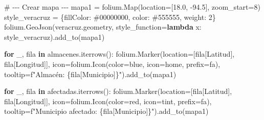 \documentclass[
  spanish,
  us-letterpaper,
]{scrreprt}
\newenvironment{Shaded}{\begin{snugshade}}{\end{snugshade}}
\newcommand{\CommentTok}[1]{\textcolor[rgb]{0.37,0.37,0.37}{#1}}
\newcommand{\ControlFlowTok}[1]{\textcolor[rgb]{0.00,0.23,0.31}{\textbf{#1}}}
\newcommand{\DecValTok}[1]{\textcolor[rgb]{0.68,0.00,0.00}{#1}}
\newcommand{\FloatTok}[1]{\textcolor[rgb]{0.68,0.00,0.00}{#1}}
\newcommand{\KeywordTok}[1]{\textcolor[rgb]{0.00,0.23,0.31}{\textbf{#1}}}
\newcommand{\NormalTok}[1]{\textcolor[rgb]{0.00,0.23,0.31}{#1}}
\newcommand{\OperatorTok}[1]{\textcolor[rgb]{0.37,0.37,0.37}{#1}}
\newcommand{\SpecialCharTok}[1]{\textcolor[rgb]{0.37,0.37,0.37}{#1}}
\newcommand{\SpecialStringTok}[1]{\textcolor[rgb]{0.13,0.47,0.30}{#1}}
\newcommand{\StringTok}[1]{\textcolor[rgb]{0.13,0.47,0.30}{#1}}
\numberwithin{equation}{section}
\begin{document}
\begin{Shaded}
\begin{Highlighting}[]
\CommentTok{\# {-}{-}{-} Crear mapa {-}{-}{-}}
\NormalTok{mapa1 }\OperatorTok{=}\NormalTok{ folium.Map(location}\OperatorTok{=}\NormalTok{[}\FloatTok{18.0}\NormalTok{, }\OperatorTok{{-}}\FloatTok{94.5}\NormalTok{], zoom\_start}\OperatorTok{=}\DecValTok{8}\NormalTok{)}
\NormalTok{style\_veracruz }\OperatorTok{=}\NormalTok{ \{}\StringTok{\textquotesingle{}fillColor\textquotesingle{}}\NormalTok{: }\StringTok{\textquotesingle{}\#00000000\textquotesingle{}}\NormalTok{,}
 \StringTok{\textquotesingle{}color\textquotesingle{}}\NormalTok{: }\StringTok{\textquotesingle{}\#555555\textquotesingle{}}\NormalTok{, }\StringTok{\textquotesingle{}weight\textquotesingle{}}\NormalTok{: }\DecValTok{2}\NormalTok{\}}
\NormalTok{folium.GeoJson(veracruz.geometry,}
\NormalTok{ style\_function}\OperatorTok{=}\KeywordTok{lambda}\NormalTok{ x: style\_veracruz).add\_to(mapa1)}

\ControlFlowTok{for}\NormalTok{ \_, fila }\KeywordTok{in}\NormalTok{ almacenes.iterrows():}
\NormalTok{    folium.Marker(location}\OperatorTok{=}\NormalTok{[fila[}\StringTok{\textquotesingle{}Latitud\textquotesingle{}}\NormalTok{],}
\NormalTok{     fila[}\StringTok{\textquotesingle{}Longitud\textquotesingle{}}\NormalTok{]],}
\NormalTok{                  icon}\OperatorTok{=}\NormalTok{folium.Icon(color}\OperatorTok{=}\StringTok{\textquotesingle{}blue\textquotesingle{}}\NormalTok{,}
\NormalTok{                   icon}\OperatorTok{=}\StringTok{\textquotesingle{}home\textquotesingle{}}\NormalTok{, prefix}\OperatorTok{=}\StringTok{\textquotesingle{}fa\textquotesingle{}}\NormalTok{),}
\NormalTok{                  tooltip}\OperatorTok{=}\SpecialStringTok{f"Almacén: }\SpecialCharTok{\{}\NormalTok{fila[}\StringTok{\textquotesingle{}Municipio\textquotesingle{}}\NormalTok{]}\SpecialCharTok{\}}\SpecialStringTok{"}\NormalTok{).add\_to(mapa1)}

\ControlFlowTok{for}\NormalTok{ \_, fila }\KeywordTok{in}\NormalTok{ afectadas.iterrows():}
\NormalTok{    folium.Marker(location}\OperatorTok{=}\NormalTok{[fila[}\StringTok{\textquotesingle{}Latitud\textquotesingle{}}\NormalTok{],}
\NormalTok{     fila[}\StringTok{\textquotesingle{}Longitud\textquotesingle{}}\NormalTok{]],}
\NormalTok{        icon}\OperatorTok{=}\NormalTok{folium.Icon(color}\OperatorTok{=}\StringTok{\textquotesingle{}red\textquotesingle{}}\NormalTok{,}
\NormalTok{         icon}\OperatorTok{=}\StringTok{\textquotesingle{}tint\textquotesingle{}}\NormalTok{, prefix}\OperatorTok{=}\StringTok{\textquotesingle{}fa\textquotesingle{}}\NormalTok{),}
\NormalTok{        tooltip}\OperatorTok{=}\SpecialStringTok{f"Municipio afectado: }\SpecialCharTok{\{}\NormalTok{fila[}\StringTok{\textquotesingle{}Municipio\textquotesingle{}}\NormalTok{]}\SpecialCharTok{\}}\SpecialStringTok{"}\NormalTok{).add\_to(mapa1)}


\end{Highlighting}
\end{Shaded}
\end{document}
